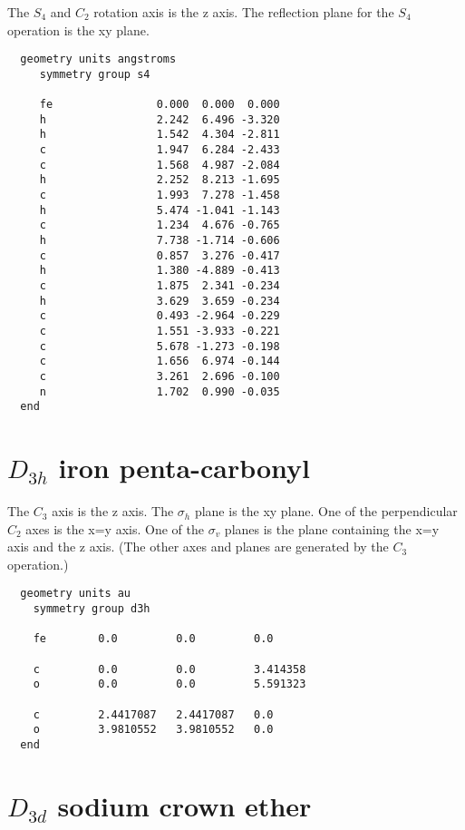 The $S_4$ and $C_2$ rotation axis is the z axis.  The reflection plane 
for the $S_4$ operation is the xy plane.

\begin{verbatim}
  geometry units angstroms
     symmetry group s4
  
     fe                0.000  0.000  0.000         
     h                 2.242  6.496 -3.320   
     h                 1.542  4.304 -2.811
     c                 1.947  6.284 -2.433
     c                 1.568  4.987 -2.084
     h                 2.252  8.213 -1.695
     c                 1.993  7.278 -1.458
     h                 5.474 -1.041 -1.143
     c                 1.234  4.676 -0.765
     h                 7.738 -1.714 -0.606
     c                 0.857  3.276 -0.417
     h                 1.380 -4.889 -0.413
     c                 1.875  2.341 -0.234
     h                 3.629  3.659 -0.234
     c                 0.493 -2.964 -0.229
     c                 1.551 -3.933 -0.221
     c                 5.678 -1.273 -0.198
     c                 1.656  6.974 -0.144
     c                 3.261  2.696 -0.100
     n                 1.702  0.990 -0.035
  end
\end{verbatim}

  \section{\protect$D_{3h}$ iron penta-carbonyl}

The $C_3$ axis is the z axis.  The $\sigma_h$ plane is the xy plane.  One of
the perpendicular $C_2$ axes is the x=y axis.  One of the $\sigma_v$ 
planes is the plane containing the x=y axis and the z axis.  (The 
other axes and planes are generated by the $C_3$ operation.)

\begin{verbatim}
  geometry units au
    symmetry group d3h

    fe        0.0         0.0         0.0

    c         0.0         0.0         3.414358
    o         0.0         0.0         5.591323

    c         2.4417087   2.4417087   0.0
    o         3.9810552   3.9810552   0.0
  end
\end{verbatim}

  \section{\protect$D_{3d}$ sodium crown ether}

